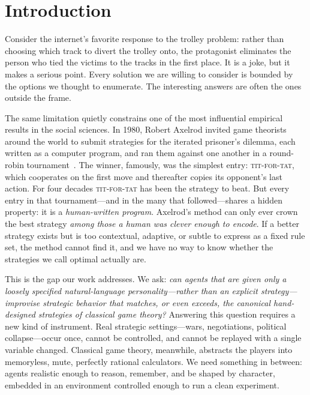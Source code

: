 
\maketitle

\section{Introduction}

Consider the internet's favorite response to the trolley problem: rather than choosing which track to divert the trolley onto, the protagonist eliminates the person who tied the victims to the tracks in the first place. It is a joke, but it makes a serious point. Every solution we are willing to consider is bounded by the options we thought to enumerate. The interesting answers are often the ones outside the frame.

The same limitation quietly constrains one of the most influential empirical results in the social sciences. In 1980, Robert Axelrod invited game theorists around the world to submit strategies for the iterated prisoner's dilemma, each written as a computer program, and ran them against one another in a round-robin tournament~\cite{axelrod1984evolution, axelrod1981science}. The winner, famously, was the simplest entry: \textsc{tit-for-tat}, which cooperates on the first move and thereafter copies its opponent's last action. For four decades \textsc{tit-for-tat} has been the strategy to beat. But every entry in that tournament---and in the many that followed---shares a hidden property: it is a \emph{human-written program}. Axelrod's method can only ever crown the best strategy \emph{among those a human was clever enough to encode}. If a better strategy exists but is too contextual, adaptive, or subtle to express as a fixed rule set, the method cannot find it, and we have no way to know whether the strategies we call optimal actually are.

This is the gap our work addresses. We ask: \emph{can agents that are given only a loosely specified natural-language personality---rather than an explicit strategy---improvise strategic behavior that matches, or even exceeds, the canonical hand-designed strategies of classical game theory?} Answering this question requires a new kind of instrument. Real strategic settings---wars, negotiations, political collapse---occur once, cannot be controlled, and cannot be replayed with a single variable changed. Classical game theory, meanwhile, abstracts the players into memoryless, mute, perfectly rational calculators. We need something in between: agents realistic enough to reason, remember, and be shaped by character, embedded in an environment controlled enough to run a clean experiment.

